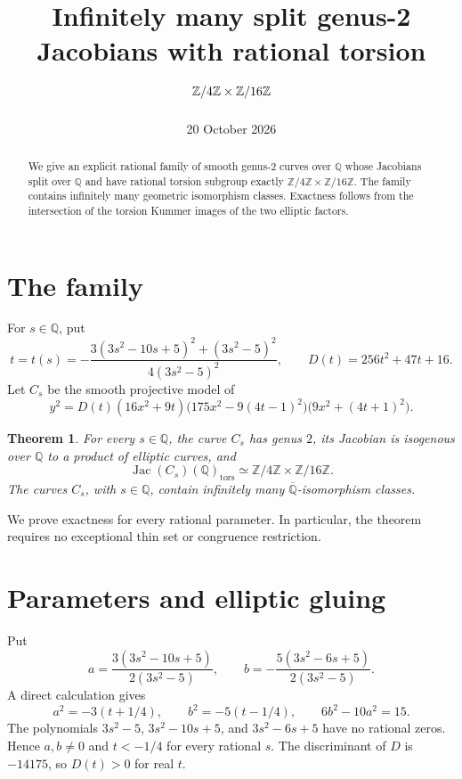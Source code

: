 \documentclass[11pt]{article}
\title{Infinitely many split genus-2 Jacobians with rational torsion
  \(\Z/4\Z\times\Z/16\Z\)}
\author{}
\date{20 October 2026}
\newtheorem{theorem}{Theorem}
\newcommand{\Q}{\mathbb Q}
\newcommand{\Z}{\mathbb Z}
\newcommand{\tors}{\mathrm{tors}}
\newcommand{\Jac}{\operatorname{Jac}}
\begin{document}
\maketitle

\begin{abstract}
We give an explicit rational family of smooth genus-2 curves over
\(\Q\) whose Jacobians split over \(\Q\) and have rational torsion
subgroup exactly \(\Z/4\Z\times\Z/16\Z\).
The family contains infinitely many geometric isomorphism classes.
Exactness follows from the intersection of the torsion Kummer images
of the two elliptic factors.
\end{abstract}

\section{The family}

For \(s\in\Q\), put
\begin{equation}\label{eq:t}
t=t(s)=-
\frac{3(3s^2-10s+5)^2+(3s^2-5)^2}{4(3s^2-5)^2},
\qquad D(t)=256t^2+47t+16.
\end{equation}
Let \(C_s\) be the smooth projective model of
\begin{equation}\label{eq:family}
y^2=D(t)(16x^2+9t)
       \bigl(175x^2-9(4t-1)^2\bigr)
       \bigl(9x^2+(4t+1)^2\bigr).
\end{equation}

\begin{theorem}\label{thm:main}
For every \(s\in\Q\), the curve \(C_s\) has genus \(2\), its Jacobian
is isogenous over \(\Q\) to a product of elliptic curves, and
\[
 \Jac(C_s)(\Q)_{\tors}\simeq\Z/4\Z\times\Z/16\Z.
\]
The curves \(C_s\), with \(s\in\Q\), contain infinitely many
\(\overline{\Q}\)-isomorphism classes.
\end{theorem}

We prove exactness for every rational parameter. In particular,
the theorem requires no exceptional thin set or congruence restriction.

\section{Parameters and elliptic gluing}

Put
\[
 a=\frac{3(3s^2-10s+5)}{2(3s^2-5)},\qquad
 b=-\frac{5(3s^2-6s+5)}{2(3s^2-5)}.
\]
A direct calculation gives
\begin{equation}\label{eq:conic}
 a^2=-3(t+1/4),\qquad b^2=-5(t-1/4),\qquad
 6b^2-10a^2=15.
\end{equation}
The polynomials \(3s^2-5\), \(3s^2-10s+5\), and \(3s^2-6s+5\)
have no rational zeros. Hence \(a,b\ne0\) and \(t<-1/4\) for every
rational \(s\). The discriminant of \(D\) is \(-14175\), so
\(D(t)>0\) for real \(t\).
\end{document}
